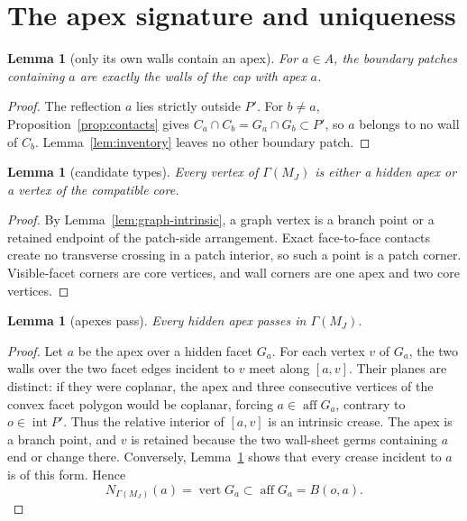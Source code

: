 \documentclass[11pt]{amsart}
\newtheorem{lemma}[theorem]{Lemma}
\theoremstyle{definition}
\newcommand{\aff}{\operatorname{aff}}
\newcommand{\GammaM}{\Gamma(M_J)}
\begin{document}
\section{The apex signature and uniqueness}
\label{sec:uniqueness}

\begin{lemma}[only its own walls contain an apex]
\label{lem:own-walls}
For $a\in A$, the boundary patches containing $a$ are exactly the walls of the
cap with apex $a$.
\end{lemma}

\begin{proof}
The reflection $a$ lies strictly outside $P'$.  For $b\ne a$,
Proposition~\ref{prop:contacts} gives
$C_a\cap C_b=G_a\cap G_b\subset P'$, so $a$ belongs to no wall of $C_b$.
Lemma~\ref{lem:inventory} leaves no other boundary patch.
\end{proof}

\begin{lemma}[candidate types]
\label{lem:candidate-types}
Every vertex of $\GammaM$ is either a hidden apex or a vertex of the compatible
core.
\end{lemma}

\begin{proof}
By Lemma~\ref{lem:graph-intrinsic}, a graph vertex is a branch point or a
retained endpoint of the patch-side arrangement.  Exact face-to-face contacts
create no transverse crossing in a patch interior, so such a point is a patch
corner.  Visible-facet corners are core vertices, and wall corners are one
apex and two core vertices.
\end{proof}

\begin{lemma}[apexes pass]
\label{lem:apexes-pass}
Every hidden apex passes in $\GammaM$.
\end{lemma}

\begin{proof}
Let $a$ be the apex over a hidden facet $G_a$.  For each vertex $v$ of $G_a$,
the two walls over the two facet edges incident to $v$ meet along $[a,v]$.
Their planes are distinct: if they were coplanar, the apex and three
consecutive vertices of the convex facet polygon would be coplanar, forcing
$a\in\aff G_a$, contrary to $o\in\operatorname{int}P'$.
Thus the relative interior of $[a,v]$ is an intrinsic crease.  The apex is a
branch point, and $v$ is retained because the two wall-sheet germs containing
$a$ end or change there.  Conversely, Lemma~\ref{lem:own-walls} shows that
every crease incident to $a$ is of this form.  Hence
\[
 N_{\GammaM}(a)=\operatorname{vert}G_a\subset\aff G_a=B(o,a).
\]
\end{proof}
\end{document}
